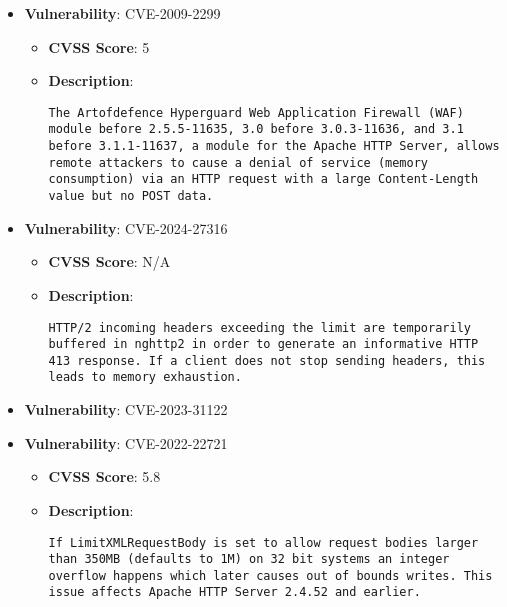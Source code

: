 \documentclass{article}
\begin{document}
\begin{itemize}
        \item \textbf{Vulnerability}: CVE-2009-2299
        \begin{itemize}
            \item \textbf{CVSS Score}:  5 
            \item \textbf{Description}:
            \parbox[t]{0.9\linewidth}{
                \verb|The Artofdefence Hyperguard Web Application Firewall (WAF) module before 2.5.5-11635, 3.0 before 3.0.3-11636, and 3.1 before 3.1.1-11637, a module for the Apache HTTP Server, allows remote attackers to cause a denial of service (memory consumption) via an HTTP request with a large Content-Length value but no POST data.|
            }
        \end{itemize}
    
        \item \textbf{Vulnerability}: CVE-2024-27316
        \begin{itemize}
            \item \textbf{CVSS Score}:  N/A 
            \item \textbf{Description}:
            \parbox[t]{0.9\linewidth}{
                \verb|HTTP/2 incoming headers exceeding the limit are temporarily buffered in nghttp2 in order to generate an informative HTTP 413 response. If a client does not stop sending headers, this leads to memory exhaustion.|
            }
        \end{itemize}
    
        \item \textbf{Vulnerability}: CVE-2023-31122
    
        \item \textbf{Vulnerability}: CVE-2022-22721
        \begin{itemize}
            \item \textbf{CVSS Score}:  5.8 
            \item \textbf{Description}:
            \parbox[t]{0.9\linewidth}{
                \verb|If LimitXMLRequestBody is set to allow request bodies larger than 350MB (defaults to 1M) on 32 bit systems an integer overflow happens which later causes out of bounds writes. This issue affects Apache HTTP Server 2.4.52 and earlier.|
            }
        \end{itemize}
    

\end{itemize}
\end{document}
